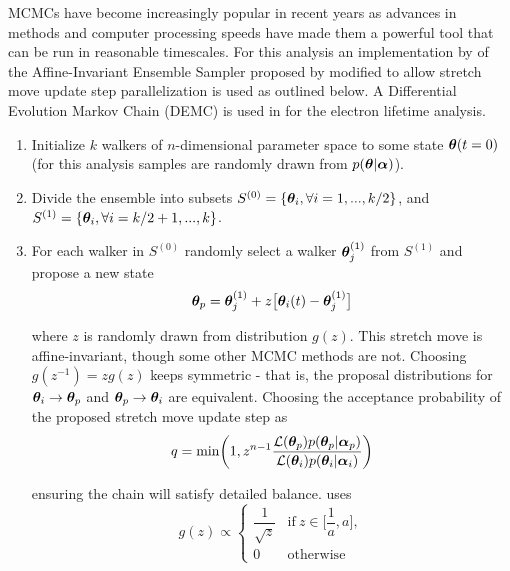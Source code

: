 MCMCs have become increasingly popular in recent years as advances in methods and computer processing speeds have made them
a powerful tool that can be run in reasonable timescales.  For this analysis an implementation by  of
the Affine-Invariant Ensemble Sampler proposed by  modified to allow stretch move update step parallelization is
used as outlined below.  A Differential Evolution Markov Chain (DEMC) is used in  for the electron
lifetime analysis.

\begin{enumerate}
\item Initialize $k$ walkers of $n$-dimensional parameter space to some state $\boldsymbol{\theta}(t = 0)$ (for this analysis samples are
randomly drawn from $p(\boldsymbol{\theta}|\boldsymbol{\alpha})$).

\item \label{itm:divide} Divide the ensemble into subsets $S^{(0)} = \{\boldsymbol{\theta}_i, \forall i = 1, . . ., k/2\}$, and
$S^{(1)} = \{\boldsymbol{\theta}_i, \forall i = k/2 + 1, . . ., k\}$.

\item \label{itm:newstate} For each walker in $S^{(0)}$ randomly select a walker $\boldsymbol{\theta}_j^{(1)}$ from $S^{(1)}$ and propose a new
state
\begin{equation}
\boldsymbol{\theta}_p = \boldsymbol{\theta}_j^{(1)} + z \big[ \boldsymbol{\theta}_i(t) - \boldsymbol{\theta}_j^{(1)} \big]
\label{eq:er_nr_calibrations_parameter_determ_mcmc_walker_update}
\end{equation}

\noindent where $z$ is randomly drawn from distribution $g(z)$. This stretch move is affine-invariant, though some other MCMC
methods are not.  Choosing
$g(z^{-1}) = z g(z)$ keeps  symmetric - that is, the proposal
distributions for $\boldsymbol{\theta}_i \rightarrow \boldsymbol{\theta}_p$ and $\boldsymbol{\theta}_p \rightarrow \boldsymbol{\theta}_i$ are
equivalent.  Choosing the
acceptance probability of the proposed stretch move update step as
\begin{equation}
q = \mathrm{min} \bigg( 1, z^{n - 1} \frac{\mathcal{L}(\boldsymbol{\theta}_p)p(\boldsymbol{\theta}_p|\boldsymbol{\alpha}_p)}
{\mathcal{L}(\boldsymbol{\theta}_i)p(\boldsymbol{\theta}_i|\boldsymbol{\alpha}_i)} \bigg)
\label{eq:er_nr_calibrations_parameter_determ_mcmc_prob}
\end{equation}

\noindent ensuring the chain will satisfy detailed balance.   uses
\begin{equation}
g(z) \propto
\begin{cases}
\dfrac{1}{\sqrt{z}} & \mathrm{if}\ z \in \bigg[ \dfrac{1}{a}, a \bigg], \\
0 & \mathrm{otherwise}
\end{cases}
\end{equation}


\end{enumerate}

